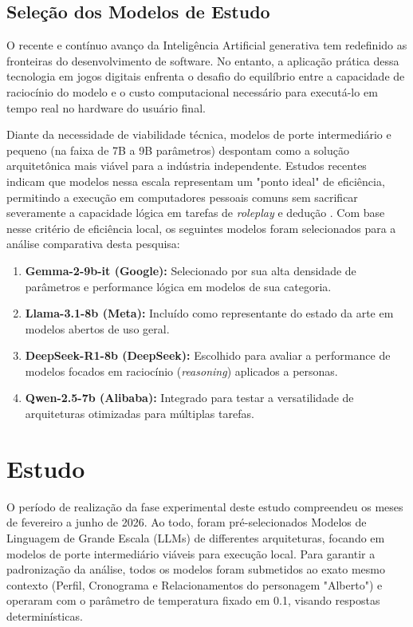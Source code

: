 \documentclass[12pt]{article}
\begin{document}
\subsection{Seleção dos Modelos de Estudo}

O recente e contínuo avanço da Inteligência Artificial generativa tem redefinido as fronteiras do desenvolvimento de software. No entanto, a aplicação prática dessa tecnologia em jogos digitais enfrenta o desafio do equilíbrio entre a capacidade de raciocínio do modelo e o custo computacional necessário para executá-lo em tempo real no hardware do usuário final.

Diante da necessidade de viabilidade técnica, modelos de porte intermediário e pequeno (na faixa de 7B a 9B parâmetros) despontam como a solução arquitetônica mais viável para a indústria independente. Estudos recentes indicam que modelos nessa escala representam um "ponto ideal" de eficiência, permitindo a execução em computadores pessoais comuns sem sacrificar severamente a capacidade lógica em tarefas de \textit{roleplay} e dedução \cite{cao2026task}. Com base nesse critério de eficiência local, os seguintes modelos foram selecionados para a análise comparativa desta pesquisa:

\begin{enumerate}
    \item \textbf{Gemma-2-9b-it (Google):} Selecionado por sua alta densidade de parâmetros e performance lógica em modelos de sua categoria.
    \item \textbf{Llama-3.1-8b (Meta):} Incluído como representante do estado da arte em modelos abertos de uso geral.
    \item \textbf{DeepSeek-R1-8b (DeepSeek):} Escolhido para avaliar a performance de modelos focados em raciocínio (\textit{reasoning}) aplicados a personas.
    \item \textbf{Qwen-2.5-7b (Alibaba):} Integrado para testar a versatilidade de arquiteturas otimizadas para múltiplas tarefas.
\end{enumerate}

\section{Estudo}

O período de realização da fase experimental deste estudo compreendeu os meses de fevereiro a junho de 2026. Ao todo, foram pré-selecionados Modelos de Linguagem de Grande Escala (LLMs) de differentes arquiteturas, focando em modelos de porte intermediário viáveis para execução local. Para garantir a padronização da análise, todos os modelos foram submetidos ao exato mesmo contexto (Perfil, Cronograma e Relacionamentos do personagem "Alberto") e operaram com o parâmetro de temperatura fixado em 0.1, visando respostas determinísticas.
\end{document}
